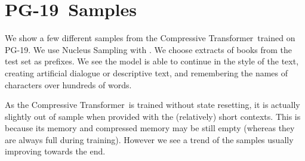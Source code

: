 \documentclass{article} \usepackage{iclr2020_conference,times}
\newcommand{\model}{Compressive Transformer}
\newcommand{\dataset}{PG-19}
\begin{document}
\section{\dataset~Samples}
\label{app:samples}
We show a few different samples from the \model~trained on \dataset. We use Nucleus Sampling with  \citep{holtzman2019curious}. We choose extracts of books from the test set as prefixes. We see the model is able to continue in the style of the text, creating artificial dialogue or descriptive text, and remembering the names of characters over hundreds of words.

As the \model~is trained without state resetting, it is actually slightly out of sample when provided with the (relatively) short contexts. This is because its memory and compressed memory may be still empty (whereas they are always full during training). However we see a trend of the samples usually improving towards the end.
\newpage
\end{document}
